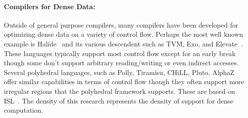 \paragraph{Compilers for Dense Data:}
Outside of general purpose compilers, many compilers have been developed for optimizing dense data on a variety of control flow.
%
Perhaps the most well known example is Halide~\cite{ragan-kelley_halide_2013} and its various descendent such as TVM, Exo, and Elevate~\cite{chen2018tvm, ikarashi2022exocompilation, hagedorn2020achieving}.
%
These languages typically support most control flow except for an early break though some don't support arbitrary reading/writing or even indirect accesses.
%
Several polyhedral languages, such as Polly, Tiramisu, CHiLL, Pluto, AlphaZ ~\cite{grosser2012polly, baghdadi2019tiramisu,chen2008framework, bondhugula2008pluto, yuki2012alphaz} offer similar capabilities in terms of control flow though they often support more irregular regions that the polyhedral framework supports.
%
These are based on ISL~\cite{verdoolaege2010isl}.
%
The density of this research represents the density of support for dense computation.


